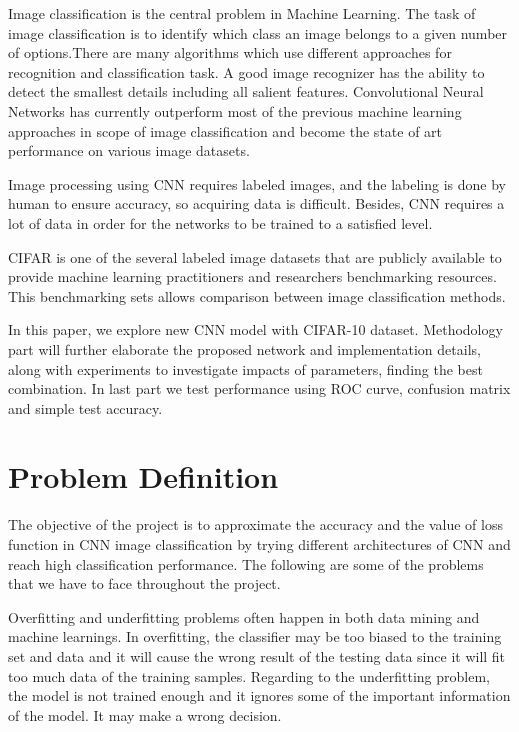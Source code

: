 \documentclass[journal,onecolumn, 12pt]{IEEEtran}
\begin{document}
\IEEEPARstart
{I}{mage} classification is the central problem in Machine Learning. The task of image classification is to identify which class an image belongs to a given number of options.There are many algorithms which use different approaches for recognition and classification task. A good image recognizer has the ability to detect the smallest details including all salient features. Convolutional Neural Networks has currently outperform most of the previous machine learning approaches in scope of image classification and become the state of art performance on various image datasets. 

Image processing using CNN requires labeled images, and the labeling is done by human to ensure accuracy, so acquiring data is difficult. Besides, CNN requires a lot of data in order for the networks to be trained to a satisfied level.

CIFAR is one of the several labeled image datasets that are publicly available to provide machine learning practitioners and researchers benchmarking resources. This benchmarking sets allows comparison between image classification methods.

In this paper, we explore new CNN model with CIFAR-10 dataset. Methodology part will further elaborate the proposed network and implementation details, along with experiments to investigate impacts of parameters, finding the best combination. In last part we test performance using ROC curve, confusion matrix and simple test accuracy.


\section{Problem Definition}
The objective of the project is to approximate the accuracy and the value of loss function in CNN image classification by trying different architectures of CNN and reach high classification performance. The following are some of the problems that we have to face throughout the project. 

Overfitting and underfitting problems often happen in both data mining and machine learnings. In overfitting, the classifier may be too biased to the training set and data and it will cause the wrong result of the testing data since it will fit too much data of the training samples. Regarding to the underfitting problem, the model is not trained enough and it ignores some of the important information of the model. It may make a wrong decision.
\end{document}
